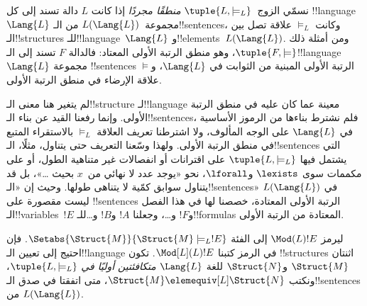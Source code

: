 \documentclass[../../../include/open-logic-section]{subfiles}
\begin{document}

\begin{defn}
نسمّي الزوج~$\tuple{L,\models_L}$ \emph{منطقًا مجردًا} إذا كانت $L$ دالة تسند إلى
كل !!{language}~$\Lang{L}$ مجموعة~$L(\Lang{L})$ من الـ!!{sentence}s،
وكانت $\models_L$ علاقة تصل بين الـ!!{structure}s للـ!!{language}~$\Lang{L}$
و!!{element}s~$L(\Lang{L})$. ومن أمثلة ذلك
$\tuple{F,\models}$، وهو منطق الرتبة الأولى المعتاد: فالدالة $F$
تسند إلى الـ!!{language}~$\Lang{L}$ مجموعة !!{sentence}s الرتبة
الأولى المبنية من الثوابت في $\Lang{L}$، و$\models$ علاقة الإرضاء في
منطق الرتبة الأولى.
\end{defn}

لم يتغير هنا معنى الـ!!{structure} لـ!!{language}
معينة عما كان عليه في منطق الرتبة الأولى. وإنما رفعنا القيد عن بناء الـ!!{sentence}s،
فلم نشترط بناءها من الرموز الأساسية في $\Lang{L}$ على الوجه المألوف، ولا اشترطنا تعريف العلاقة
$\models_L$ بالاستقراء المتبع في منطق الرتبة الأولى. ولهذا وسّعنا
التعريف حتى يتناول، مثلًا، الـ!!{sentence}s التي يشتمل فيها
$\tuple{L,\models_L}$ على اقترانات أو انفصالات غير متناهية الطول، أو على مكممات
سوى $\lexists$ و$\lforall$، نحو «يوجد عدد لا نهائي من~$x$ بحيث
\dots»، بل قد يتناول سوابق كمّية لا يتناهى طولها. وحيث إن
«الـ!!{sentence}s» في $L(\Lang{L})$ ليست مقصورة على !!{sentence}s
الرتبة الأولى المعتادة، خصصنا لها في هذا الفصل الـ!!{variable}s~$!E$
و$!F$ و\dots، وجعلنا $!A$ و$!B$ و\dots للـ!!{formula}s
المعتادة من الرتبة الأولى.

\begin{defn}
ليرمز $\Mod(L){!E}$ إلى الفئة
$\Setabs{\Struct{M}}{\Struct{M} \models_L !E}$. فإن احتيج إلى تعيين
الـ!!{language} في الرمز كتبنا $\Mod[L](L){!E}$. تكون !!{structure}s اثنتان
$\Struct{M}$ و$\Struct{N}$ للغة $\Lang{L}$ \emph{متكافئتين أوليًا في}
$\tuple{L,\models_L}$، ونكتب
$\Struct{M} \elemequiv[L] \Struct{N}$، متى اتفقتا في صدق الـ!!{sentence}s
من $L(\Lang{L})$.
\end{defn}
\end{document}

